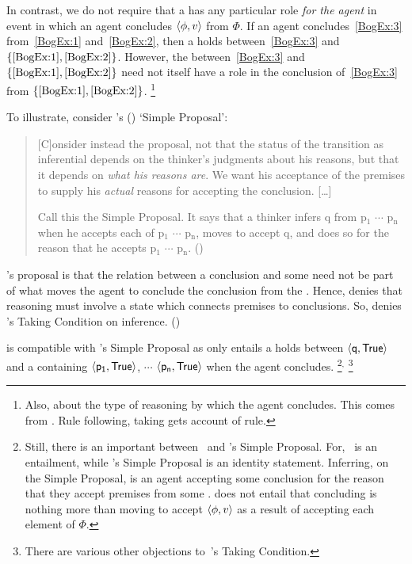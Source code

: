 \begin{note}
  In contrast, we do not require that a \ros{} has any particular role \emph{for the agent} in event in which an agent concludes \(\langle \phi, v \rangle\) from \(\Phi\).
  If an agent concludes~\ref{BogEx:3} from~\ref{BogEx:1} and~\ref{BogEx:2}, then a \ros{} holds between~\ref{BogEx:3} and \(\{\ref{BogEx:1}, \ref{BogEx:2}\}\).
  However, the \ros{} between~\ref{BogEx:3} and \(\{\ref{BogEx:1}, \ref{BogEx:2}\}\) need not itself have a role in the \agents{} conclusion of~\ref{BogEx:3} from \(\{\ref{BogEx:1}, \ref{BogEx:2}\}\).%
  \footnote{
    Also, about the type of reasoning by which the agent concludes.
    This comes from \textcite{Boghossian:2008vf,Boghossian:2012vb}.
    Rule following, taking gets account of rule.
  }

  To illustrate, consider \citeauthor{Wright:2014tt}'s (\citeyear{Wright:2014tt}) `Simple Proposal':
  \begin{quote}
    [C]onsider instead the proposal, not that the status of the transition as inferential depends on the thinker's judgments about his reasons, but that it depends on \emph{what his reasons are}.
    We want his acceptance of the premises to supply his \emph{actual} reasons for accepting the conclusion.
    [\dots]

    Call this the Simple Proposal.
    It says that a thinker infers q from p\(_{1}\) \(\cdots\) p\(_{\text{n}}\) when he accepts each of p\(_{1}\) \(\cdots\) p\(_{\text{n}}\), moves to accept q, and does so for the reason that he accepts p\(_{1}\) \(\cdots\) p\(_{\text{n}}\).%
    \mbox{}\hfill\mbox{(\citeyear[33]{Wright:2014tt})}
  \end{quote}

  \noindent%
  \citeauthor{Wright:2014tt}'s proposal is that the relation between a conclusion and some \pool{} need not be part of what moves the agent to conclude the conclusion from the \pool{}.
  Hence, \citeauthor{Wright:2014tt} denies that reasoning must involve a state which connects premises to conclusions.
  So, \citeauthor{Wright:2014tt} denies \citeauthor{Boghossian:2008vf}'s Taking Condition on inference.
  (\citeyear[Cf.][33-34]{Wright:2014tt})

  \supportI{} is compatible with \citeauthor{Wright:2014tt}'s Simple Proposal as \supportI{} only entails a \ros{} holds between \(\pv{\propM{q}}{\valI{True}}\) and a \pool{} containing \(\pv{\propM{p_{1}}}{\valI{True}}\), \(\cdots\) \(\pv{\propM{p_{n}}}{\valI{True}}\) when the agent concludes.%
  \footnote{
    Still, there is an important between~\supportI{} and \citeauthor{Wright:2014tt}'s Simple Proposal.
    For,~\supportI{} is an entailment, while \citeauthor{Wright:2014tt}'s Simple Proposal is an identity statement.
    Inferring, on the Simple Proposal, is an agent accepting some conclusion for the reason that they accept premises from some \pool{}.
    \supportI{} does not entail that concluding is nothing more than moving to accept \(\langle \phi, v \rangle\) as a result of accepting each element of \(\Phi\).
  }\(^{,}\)%
  \footnote{
    There are various other objections to~\citeauthor{Boghossian:2014aa}'s Taking Condition.

}
\end{note}
